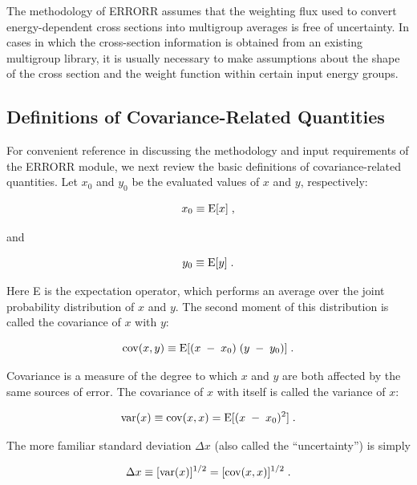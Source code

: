 The methodology of ERRORR assumes that the weighting flux
 used to convert energy-dependent cross sections
into multigroup averages is free of uncertainty.  In cases in which
the cross-section information is obtained from an existing multigroup
library, it is usually necessary to make assumptions about the shape
of the cross section and the weight function within certain input
energy groups.

\subsection{Definitions of Covariance-Related Quantities}
\label{ssERRORR_Defs}

For convenient reference in discussing the methodology and input
requirements of the ERRORR module, we next review the basic definitions
of covariance-related quantities.  Let $x_{0}$ and $y_{0}$ be the
evaluated values of $x$ and $y$, respectively:

\begin{equation}
   x_{0} \equiv {\rm E}[x] \; ,
\end{equation}

\noindent
and

\begin{equation}
   y_0 \equiv {\rm E}[y] \; .
\end{equation}

\noindent
Here E is the expectation operator, which performs an average over the
joint probability distribution of $x$ and $y$.  The second moment of
this distribution is called the covariance of $x $ with $y$:

\begin{equation}
{\rm cov} (x,y) \equiv {\rm E}[(x\;-\;x_0)\;(y\;-\;y_0)]\;.
\label{cov}
\end{equation}

\noindent
Covariance is a measure of the degree to which $x$ and $y$ are both
affected by the same sources of error.  The covariance of $x$ with
itself is called the variance of $x$:

\begin{equation}
{\rm var}(x) \equiv {\rm cov}(x,x) = {\rm E}[(x\;-\;x_0)^2]\;.
\end{equation}

\noindent
The more familiar standard deviation $\Delta x$ (also called the
``uncertainty'') is simply

\begin{equation}
\Delta x \equiv [{\rm var} (x)]^{1/2} = [{\rm cov}(x,x)]^{1/2} \; .
\label{deltax}
\end{equation}

